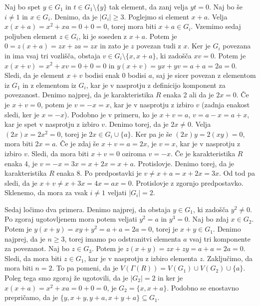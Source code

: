 \documentclass[a4paper, 12pt]{amsart}
\theoremstyle{definition} %
\theoremstyle{plain} %
\begin{document}
Naj bo spet $y\in G_1$ in $t\in   G_1 \setminus \{y\}$ tak element, da zanj velja $yt = 0$. Naj bo še $i \neq 1$ in $x\in G_i$. Denimo, da je $|G_i|  \ge 3$. Poglejmo si element $x+a$. Velja $x(x+a) = x^2 + xa = 0+ 0 = 0$, torej mora biti $x+a\in G_i$. Vzemimo sedaj poljuben element $z\in G_i$, ki je soseden z $x+a$. Potem je $0=z(x+a) =zx + za =zx$ in zato je $z$ povezan tudi z $x$. Ker je $G_i$ povezana in ima vsaj tri vozlišča, obstaja $v\in G_i \setminus \{x,x+a\}$, ki zadošča $xv = 0$. Potem je $x(x+v) = x^2 + xv = 0 + 0 = 0$ in $y(x+v) = yx +yv = a + a = 2a = 0$. Sledi, da je element $x+v$ bodisi enak 0 bodisi $a$, saj je sicer povezan z elementom iz $G_1$ in z elementom iz $G_i$, kar je v nasprotju z definicijo komponent za povezanost.
Denimo najprej, da je karakteristika $R$ enaka 2 ali da je $2x=0$. Če je $x+v=0$, potem je $v=-x=x$, kar je v nasprotju z izbiro $v$ (zadnja enakost sledi, ker je $x=-x$). Podobno je v primeru, ko je $x+v = a$, $v = a-x = a + x$, kar je spet v nasprotju z izbiro $v$. Denimo torej, da je $2x\neq 0$. Velja $(2x)x = 2x^2  = 0$, torej je $2x \in G_i \cup\{a\}$. Ker pa je še $(2x)y = 2 (xy) = 0$, mora biti $2x = a$. Če je zdaj še $x+v = a = 2x$, je $v=x$, kar je v nasprotju z izbiro $v$. Sledi, da mora biti $x+v=0$ oziroma $v=-x$. Če je karakteristika $R$ enaka 4, je $v = - x = 3x = x+ 2x = x+a$. Protislovje. Denimo torej, da je karakteristika $R$ enaka 8. Po predpostavki je $v \neq x+a = x+2x = 3x$. Od tod pa sledi, da je $x+v \neq x+3x = 4x = ax = 0$. Protislovje z zgornjo predpostavko. Sklenemo, da mora  za vsak $i\neq1$ veljati $|G_i| = 2$.

Sedaj ločimo dva primera. Denimo najprej, da obstaja $y\in G_1$, ki zadošča $y^2 \neq 0$. Po zgoraj ugotovljenem mora potem veljati $y^2 = a $ in $y^3 = 0$. Naj bo zdaj $x\in G_2$. Potem je $y(x+y) = xy + y^2 = a +a = 2a = 0$, torej je $x+y\in G_1$. Denimo najprej, da je $n\ge 3$, torej imamo po odstranitvi elementa $a$ vsaj tri komponente za povezanot. Naj bo $z\in G_3$. Potem je $z(x+y) = zx + zy = a+ a= 2a = 0$. Sledi, da mora biti $z\in G_1$, kar je v nasprotju z izbiro elementa $z$. Zaključimo, da mora biti $n=2$. To pa pomeni, da je $V(\Gamma(R)) = V(G_1) \cup V(G_2) \cup \{a\}$. Poleg tega smo zgoraj že ugotovili, da je $|G_2| = 2$  in ker je $x(x+a) = x^2 + xa = 0+0= 0$, je $G_2 = \{x,x+a\}$. Podobno se enostavno prepričamo, da je $\{y,x+y,y+a,x+y+a\}\subseteq G_1$. 
\end{document}
